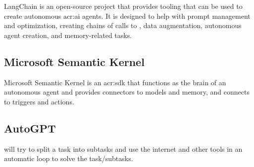 LangChain \citep{chaseLangChain2022} is an open-source project that provides tooling that can be used to create autonomous \acrshort{acr:ai} agents. It is designed to help with prompt management and optimization, creating chains of calls to , data augmentation, autonomous agent creation, and memory-related tasks.

\subsection{Microsoft Semantic Kernel}\label{subsubsec:microsoft-semantic-kernel}

Microsoft Semantic Kernel is an \acrshort{acr:sdk} that functions as the brain of an autonomous agent and provides connectors to models and memory, and connects to triggers and actions.

\subsection{AutoGPT}\label{subsubsec:autogpt}

\cite{richardAutoGPTHeartOpensource2023} will try to split a task into subtasks and use the internet and other tools in an automatic loop to solve the task/subtasks.


\glsresetall